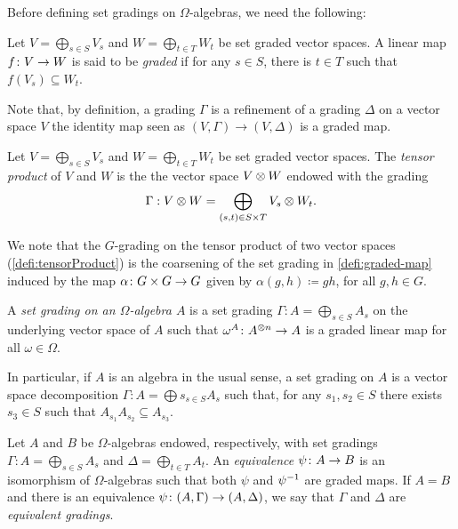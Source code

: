 Before defining set gradings on $\Omega$-algebras, we need the following:

\begin{defi}\label{defi:graded-map}
    Let $V = \bigoplus_{s\in S} V_s$ and $W = \bigoplus_{t\in T} W_t$ be set graded vector spaces. 
    A linear map $f\colon V \to W$ is said to be  \emph{graded} if for any $s \in S$, there is $t \in T$ such that $f(V_s) \subseteq W_t$. 
\end{defi}

Note that, by definition, a grading $\Gamma$ is a refinement of a grading $\Delta$ on a vector space $V$ \IFF the identity map seen as $(V, \Gamma) \to (V, \Delta)$ is a graded map. 

\begin{defi}
    Let $V = \bigoplus_{s\in S} V_s$ and $W = \bigoplus_{t\in T} W_t$ be set graded vector spaces. 
    The \emph{tensor product} of $V$ and $W$ is the the vector space $V \otimes W$ endowed with the grading
    \[
        \Gamma : V \otimes W = \bigoplus_{(s,t) \in S \times T} V_s \otimes W_t. 
    \]
\end{defi}

    We note that the $G$-grading on the tensor product of two  vector spaces (\cref{defi:tensorProduct}) is the coarsening of the set grading in \cref{defi:graded-map} induced by the map $\alpha\colon G\times G \to G$ given by $\alpha (g,h) \coloneqq gh$, for all $g,h \in G$. 

\begin{defi}
    A \emph{set grading on an $\Omega$-algebra $A$} is a set grading $\Gamma : A = \bigoplus_{s\in S} A_s$ on the underlying vector space of $A$ such that $\omega^A\colon A^{\otimes n} \to A$ is a graded linear map for all $\omega \in \Omega$. 
\end{defi}

In particular, if $A$ is an algebra in the usual sense, a set grading on $A$ is a vector space decomposition $\Gamma : A = \bigoplus s_{s\in S} A_s$ such that, for any $s_1,s_2\in S$ there exists $s_3\in S$ such that $A_{s_1} A_{s_2} \subseteq A_{s_3}$.

\begin{defi}\label{defi:equivalence}
    Let $A$ and $B$ be $\Omega$-algebras endowed, respectively, with set gradings ${\Gamma : A = \bigoplus_{s \in S} A_{s}}$ and ${\Delta = \bigoplus_{t \in T} A_{t}}$. 
    An \emph{equivalence} $\psi\colon A \to B$ is an isomorphism of $\Omega$-algebras such that both $\psi$ and $\psi^{-1}$ are graded maps. 
    If $A = B$ and there is an equivalence $\psi\colon (A, \Gamma) \to (A, \Delta)$, we say that $\Gamma$ and $\Delta$ are \emph{equivalent gradings}. 
\end{defi}

